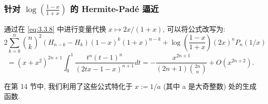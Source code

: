 \subsubsection{针对 \(\log\left(\frac{1-x}{1+x}\right)\) 的 Hermite-Pad{\'e} 逼近}\label{sec:3.3.13}

通过在 \eqref{eq:3.3.8} 中进行变量代换 \(x\mapsto 2x/(1+x)\), 可以将公式改写为:
\[ 2\sum_{k=0}^{n} {n \choose k}^2 (H_{n-k} - H_k) (1-x)^k (1+x)^{n-k} + \log\left(\frac{1-x}{1+x}\right) (2x)^n P_n(1/x) \]
\[ = (x+x^2)^{2n+1} \int_0^1 \frac{t^n (t-1)^n}{(2tx-1-x)^{n+1}} dt = -\frac{x^{2n+1}}{(2n+1){2n \choose n}} + O(x^{2n+2}). \]

在第 14 节中, 我们利用了这些公式特化于 \(x := 1/a\) (其中 a 是大奇整数) 处的生成函数.